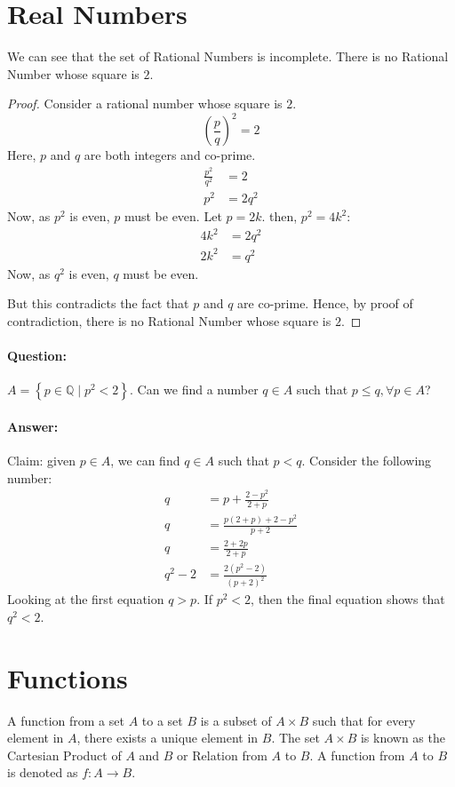 \documentclass[12pt, oneside]{book}
\theoremstyle{definition}
\begin{document}
\section{Real Numbers}
We can see that the set of Rational Numbers is incomplete.
There is no Rational Number whose square is \(2\).
\begin{proof} Consider a rational number whose square is \(2\).
\[ \left(\frac{p}{q}\right)^2 = 2 \]
Here, \(p\) and \(q\) are both integers and co-prime.
\begin{align*}
	\frac{p^2}{q^2} & = 2    \\
	p^2             & = 2q^2
\end{align*}
Now, as \(p^2\) is even, \(p\) must be even.
Let \(p = 2k\). then, \(p^2 = 4k^2\):
\begin{align*}
	4k^2 & = 2q^2 \\
	2k^2 & = q^2
\end{align*}
Now, as \(q^2\) is even, \(q\) must be even.

But this contradicts the fact that \(p\) and \(q\) are co-prime.
Hence, by proof of contradiction, there is no Rational Number whose square is \(2\).
\end{proof}

\paragraph{Question:} \(A = \left\{ p \in \mathbb{Q} \; | \; p^2 < 2 \right\}\).
Can we find a number \(q \in A\) such that \( p \leq q, \forall p \in A \)?
\paragraph{Answer:} Claim: given \(p \in A\), we can find \(q \in A\) such that \(p < q\).
Consider the following number:
\begin{align*}
	q       & = p + \frac{2-p^2}{2+p}                              \\
	q       & = \frac{p\left(2+p\right) + 2 - p^2}{p +2}           \\
	q       & = \frac{2 + 2p}{2 + p}                               \\
	q^2 - 2 & = \frac{2\left(p^2 - 2\right)}{\left(p + 2\right)^2}
\end{align*}
Looking at the first equation \(q > p\). If \(p^2 < 2\), then the final equation shows that \(q^2 < 2\).

\section{Functions}
A function from a set \(A\) to a set \(B\) is a subset of \(A \times B\) such that for every element in \(A\), there exists a unique element in \(B\).
The set \(A \times B \) is known as the Cartesian Product of \(A\) and \(B\) or Relation from \(A\) to \(B\).
A function from \(A\) to \(B\) is denoted as \(f: A \to B\).
\end{document}
